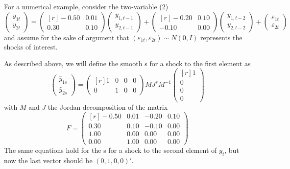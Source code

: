 \documentclass[12pt,fleqn]{article}
\newcommand{\vep}{\varepsilon}
\begin{document}
For a numerical example, consider the two-variable \VAR(2)
\begin{equation}\label{eq:2}
  \begin{pmatrix}
    y_{1t} \\ y_{2t}
  \end{pmatrix}
  =
  \begin{pmatrix*}[r]
    - 0.50 & 0.01 \\ 0.30 & 0.10
  \end{pmatrix*}
  \begin{pmatrix}
    y_{1,t-1} \\ y_{2,t-1}
  \end{pmatrix}
  +
  \begin{pmatrix*}[r]
    -0.20 & 0.10 \\ -0.10 & 0.00
  \end{pmatrix*}
  \begin{pmatrix}
    y_{1,t-2} \\ y_{2,t-2}
  \end{pmatrix}
  +
  \begin{pmatrix}
    \vep_{1t} \\ \vep_{2t}
  \end{pmatrix}
\end{equation}
and assume for the sake of argument that $(\vep_{1t},\vep_{2t}) \sim
N(0,I)$ represents the shocks of interest.

As described above, we will define the smooth \IRF s for a shock to
the first element as
\begin{equation*}
  \begin{pmatrix}
    \hat y_{1s} \\ \hat y_{2s}
  \end{pmatrix}
  =
  \begin{pmatrix*}[r]
    1 & 0 & 0 & 0 \\ 0 & 1 & 0 & 0
  \end{pmatrix*}
  M J^s M^{-1}
  \begin{pmatrix*}[r]
    1 \\ 0 \\ 0 \\ 0
  \end{pmatrix*}
\end{equation*}
with $M$ and $J$ the Jordan decomposition of the matrix
\begin{equation}
F = \begin{pmatrix*}[r]
    - 0.50 & 0.01 & -0.20 & 0.10 \\
      0.30 & 0.10 & -0.10 & 0.00 \\
      1.00 & 0.00 & 0.00 & 0.00 \\
      0.00 & 1.00 & 0.00 & 0.00
  \end{pmatrix*}
\end{equation}
The same equations hold for the \IRF s for a shock to the second
element of $y_t$, but now the last vector should be $(0, 1, 0, 0)'$.
\end{document}
